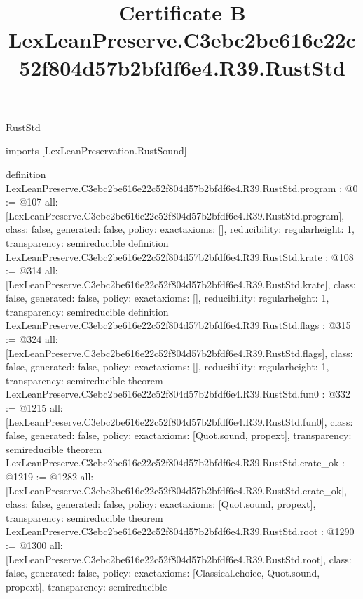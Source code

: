 \begin{lexlean}{RustStd}
\title{Certificate B LexLeanPreserve.C3ebc2be616e22c52f804d57b2bfdf6e4.R39.RustStd}
\begin{coremodule}
imports [LexLeanPreservation.RustSound]

definition LexLeanPreserve.C3ebc2be616e22c52f804d57b2bfdf6e4.R39.RustStd.program : @0 := @107 {
  all: [LexLeanPreserve.C3ebc2be616e22c52f804d57b2bfdf6e4.R39.RustStd.program],
  class: false,
  generated: false,
  policy: exact{axioms: []},
  reducibility: regular{height: 1},
  transparency: semireducible
}
definition LexLeanPreserve.C3ebc2be616e22c52f804d57b2bfdf6e4.R39.RustStd.krate : @108 := @314 {
  all: [LexLeanPreserve.C3ebc2be616e22c52f804d57b2bfdf6e4.R39.RustStd.krate],
  class: false,
  generated: false,
  policy: exact{axioms: []},
  reducibility: regular{height: 1},
  transparency: semireducible
}
definition LexLeanPreserve.C3ebc2be616e22c52f804d57b2bfdf6e4.R39.RustStd.flags : @315 := @324 {
  all: [LexLeanPreserve.C3ebc2be616e22c52f804d57b2bfdf6e4.R39.RustStd.flags],
  class: false,
  generated: false,
  policy: exact{axioms: []},
  reducibility: regular{height: 1},
  transparency: semireducible
}
theorem LexLeanPreserve.C3ebc2be616e22c52f804d57b2bfdf6e4.R39.RustStd.fun0 : @332 := @1215 {
  all: [LexLeanPreserve.C3ebc2be616e22c52f804d57b2bfdf6e4.R39.RustStd.fun0],
  class: false,
  generated: false,
  policy: exact{axioms: [Quot.sound, propext]},
  transparency: semireducible
}
theorem LexLeanPreserve.C3ebc2be616e22c52f804d57b2bfdf6e4.R39.RustStd.crate_ok : @1219 := @1282 {
  all: [LexLeanPreserve.C3ebc2be616e22c52f804d57b2bfdf6e4.R39.RustStd.crate_ok],
  class: false,
  generated: false,
  policy: exact{axioms: [Quot.sound, propext]},
  transparency: semireducible
}
theorem LexLeanPreserve.C3ebc2be616e22c52f804d57b2bfdf6e4.R39.RustStd.root : @1290 := @1300 {
  all: [LexLeanPreserve.C3ebc2be616e22c52f804d57b2bfdf6e4.R39.RustStd.root],
  class: false,
  generated: false,
  policy: exact{axioms: [Classical.choice, Quot.sound, propext]},
  transparency: semireducible
}


\end{coremodule}
\end{lexlean}
